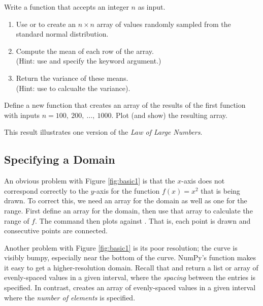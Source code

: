 \begin{problem} %
Write a function that accepts an integer $n$ as input.
\begin{enumerate}
\item Use  or  to create an $n\times n$ array of values randomly sampled from the standard normal distribution.
\item Compute the mean of each row of the array.
\\(Hint: use  and specify the  keyword argument.)
\item Return the variance of these means.
\\(Hint: use  to calcualte the variance).
\end{enumerate}
Define a new function that creates an array of the results of the first function with inputs $n = 100,\ 200,\ \ldots,\ 1000$.
Plot (and show) the resulting array.

This result illustrates one version of the \emph{Law of Large Numbers}.
\end{problem}

\subsection*{Specifying a Domain} %

An obvious problem with Figure \ref{fig:basic1} is that the $x$-axis does not correspond correctly to the $y$-axis for the function $f(x) = x^2$ that is being drawn.
To correct this, we need an array for the domain as well as one for the range.
First define an array  for the domain, then use that array to calculate the range  of $f$.
The command  then plots  against .
That is, each point  is drawn and consecutive points are connected.

Another problem with Figure \ref{fig:basic1} is its poor resolution; the curve is visibly bumpy, especially near the bottom of the curve.
NumPy's  function makes it easy to get a higher-resolution domain.
Recall that  and  return a list or array of evenly-spaced values in a given interval, where the \emph{spacing} between the entries is specified.
In contrast,  creates an array of evenly-spaced values in a given interval where the \emph{number of elements} is specified.

